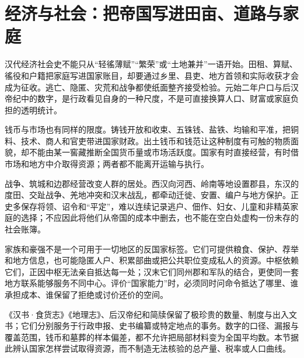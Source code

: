 \section{经济与社会：把帝国写进田亩、道路与家庭}

汉代经济社会史不能只从“轻徭薄赋”“繁荣”或“土地兼并”一语开始。田租、算赋、徭役和户籍把家庭写进国家账目，却要通过乡里、县吏、地方首领和实际收获才会成为征收。逃亡、隐匿、灾荒和战争都使纸面整齐接受检验。元始二年户口与后汉帝纪中的数字，是行政看见自身的一种尺度，不是可直接换算人口、财富或家庭负担的透明统计。

钱币与市场也有同样的限度。铸钱开放和收束、五铢钱、盐铁、均输和平准，把铜料、技术、商人和官吏带进国家财政。出土钱币和钱范让这种制度有可触的物质面貌，却不能由某一窖藏推断全国货币量或市场活跃度。国家有时直接经营，有时借市场和地方中介取得资源；两者都不能离开运输与执行。

战争、筑城和边郡经营改变人群的居处。西汉向河西、岭南等地设置郡县，东汉的度田、交趾战争、羌地冲突和汉末战乱，都牵动迁徙、安置、编户与地方保护。正史多保存将领、诏令和“平定”，难以连续记录逃户、佃作、妇女、儿童和非精英家庭的选择；不应因此将他们从帝国的成本中删去，也不能在空白处虚构一份未存的社会账簿。

家族和豪强不是一个可用于一切地区的反国家标签。它们可提供粮食、保护、荐举和地方信息，也可能隐匿人户、积累部曲或把公共职位变成私人的资源。中枢依赖它们，正因中枢无法亲自抵达每一处；汉末它们同州郡和军队的结合，更使同一套地方联系能够服务不同中心。评价“国家能力”时，必须同时问命令抵达了哪里、谁承担成本、谁保留了拒绝或讨价还价的空间。

\begin{debate}[数字与遗存能说多远]
《汉书·食货志》《地理志》、后汉帝纪和简牍保留了极珍贵的数量、制度与出入文书；它们分别服务于行政申报、史书编纂或特定地点的事务。数字的口径、漏报与覆盖范围，钱币和墓葬的样本偏差，都不允许把局部材料变为全国平均数。本节据此辨认国家怎样尝试取得资源，而不制造无法核验的总产量、税率或人口曲线。
\end{debate}
